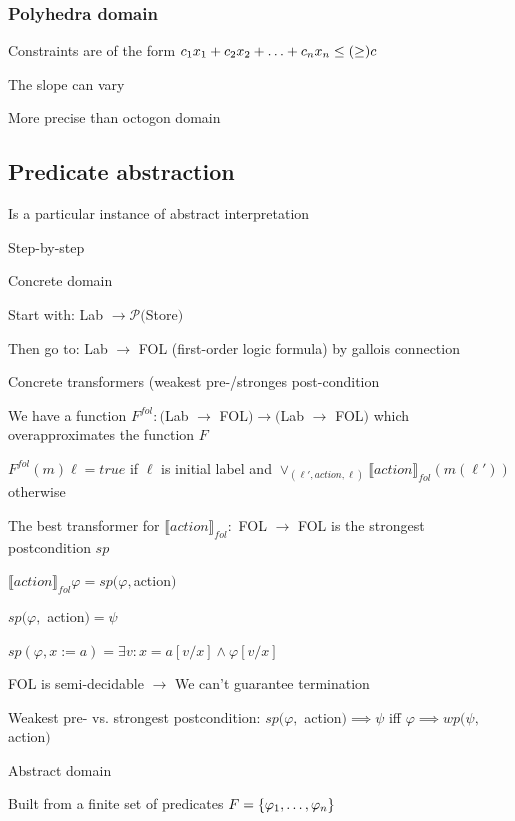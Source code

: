 \subsubsection{Polyhedra domain}
\enumstart
	\item Constraints are of the form $c_1x_1 + c_2x_2 + \mathellipsis + c_nx_n \le(\ge) c$
	\item The slope can vary
	\item More precise than octogon domain
\enumend

\subsection{Predicate abstraction}
\enumstart
	\item Is a particular instance of abstract interpretation
	\item Step-by-step
	\enumstart
		\item Concrete domain
		\enumstart
			\item Start with: Lab $\rightarrow \mathcal{P}($Store$)$
			\item Then go to: Lab $\rightarrow$ FOL (first-order logic formula) by gallois connection
		\enumend
		\item Concrete transformers (weakest pre-/stronges post-condition
		\enumstart
			\item We have a function $F^{fol}: ($Lab $\rightarrow$ FOL$) \rightarrow ($Lab $\rightarrow$ FOL$)$ which overapproximates the function $F$
			\item $F^{fol}(m)\ell = true$ if $\ell$ is initial label and $\lor_{(\ell', action, \ell)} \llbracket action \rrbracket_{fol}(m(\ell'))$ otherwise
			\item The best transformer for $\llbracket action \rrbracket_{fol}:$ FOL $\rightarrow$ FOL is the strongest postcondition $sp$
			\item $\llbracket action \rrbracket_{fol} \varphi = sp(\varphi, $action$)$
			\item $sp(\varphi,$ action$) = \psi$
			\item $sp(\varphi, x := a) = \exists v: x = a[v/x] \land \varphi[v/x]$
			\item FOL is semi-decidable $\rightarrow$ We can't guarantee termination
			\item Weakest pre- vs. strongest postcondition: $sp(\varphi,$ action$) \implies \psi$ iff $\varphi \implies wp(\psi, $action$)$
		\enumend
		\item Abstract domain
		\enumstart
			\item Built from a finite set of predicates $F = \{\varphi_1, \mathellipsis, \varphi_n\}$

